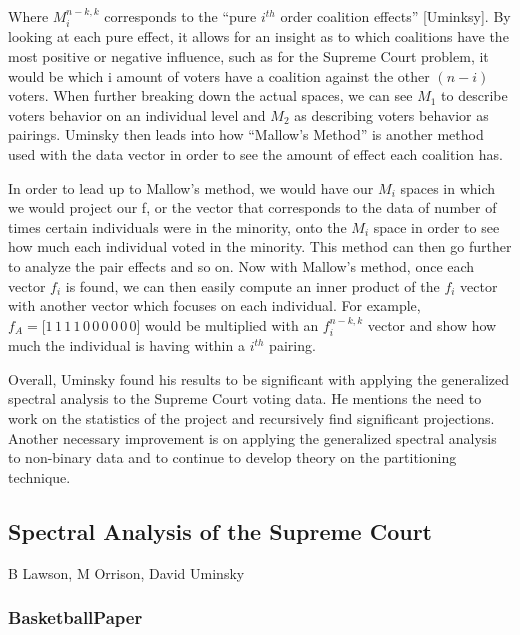 \documentclass{article}
\theoremstyle{remark}
\theoremstyle{definition}
\begin{document}
Where $M_i^{n-k,k}$ corresponds to the “pure $i^{th}$ order coalition effects” [Uminksy]. By looking at each pure effect, it allows for an insight as to which coalitions have the most positive or negative influence, such as for the Supreme Court problem, it would be which i amount of voters have a coalition against the other $(n-i)$ voters. When further breaking down the actual spaces, we can see $M_1$ to describe voters behavior on an individual level and $M_2$ as describing voters behavior as pairings. Uminsky then leads into how “Mallow’s Method” is another method used with the data vector in order to see the amount of effect each coalition has. \par
	In order to lead up to Mallow’s method, we would have our $M_i$ spaces in which we would project our f, or the vector that corresponds to the data of number of times certain individuals were in the minority, onto the $M_i$ space in order to see how much each individual voted in the minority. This method can then go further to analyze the pair effects and so on. Now with Mallow’s method, once each vector $f_i$ is found, we can then easily compute an inner product of the $f_i$ vector with another vector which focuses on each individual. For example, $f_A=\lbrack 1\, 1\, 1\, 1\, 0\, 0\, 0\, 0\, 0\, 0 \rbrack$ would be multiplied with an $f_i^{n-k,k}$ vector and show how much the individual is having within a $i^{th}$ pairing. \par
	Overall, Uminsky found his results to be significant with applying the generalized spectral analysis to the Supreme Court voting data. He mentions the need to work on the statistics of the project and recursively find significant projections.  Another necessary improvement is on applying the generalized spectral analysis to non-binary data and to continue to develop theory on the partitioning technique.
\subsection{Spectral Analysis of the Supreme Court} 
B Lawson, M Orrison, David Uminsky

\subsubsection{BasketballPaper} 
\end{document}
